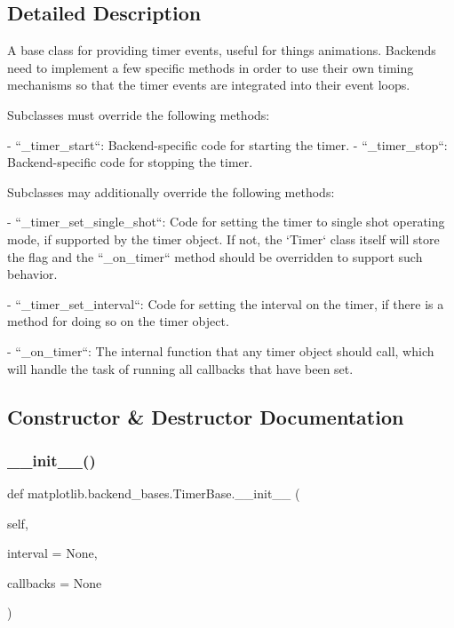 \subsection{Detailed Description}
\begin{DoxyVerb}A base class for providing timer events, useful for things animations.
Backends need to implement a few specific methods in order to use their
own timing mechanisms so that the timer events are integrated into their
event loops.

Subclasses must override the following methods:

- ``_timer_start``: Backend-specific code for starting the timer.
- ``_timer_stop``: Backend-specific code for stopping the timer.

Subclasses may additionally override the following methods:

- ``_timer_set_single_shot``: Code for setting the timer to single shot
  operating mode, if supported by the timer object.  If not, the `Timer`
  class itself will store the flag and the ``_on_timer`` method should be
  overridden to support such behavior.

- ``_timer_set_interval``: Code for setting the interval on the timer, if
  there is a method for doing so on the timer object.

- ``_on_timer``: The internal function that any timer object should call,
  which will handle the task of running all callbacks that have been set.
\end{DoxyVerb}
 

\subsection{Constructor \& Destructor Documentation}
\mbox{\label{classmatplotlib_1_1backend__bases_1_1TimerBase_accab61924e1bbf99cc279c4623f765f0}} 
\subsubsection{\texorpdfstring{\+\_\+\+\_\+init\+\_\+\+\_\+()}{\_\_init\_\_()}}
{\footnotesize\ttfamily def matplotlib.\+backend\+\_\+bases.\+Timer\+Base.\+\_\+\+\_\+init\+\_\+\+\_\+ (\begin{DoxyParamCaption}\item[{}]{self,  }\item[{}]{interval = {\ttfamily None},  }\item[{}]{callbacks = {\ttfamily None} }\end{DoxyParamCaption})}

